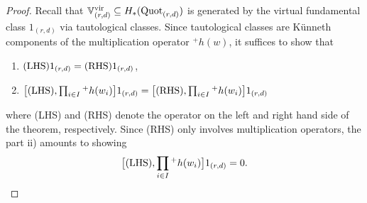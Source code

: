 \documentclass[10pt]{amsart}
\newcommand{\BV}{\mathbb{V}}
\newcommand{\Quot}{\textnormal{Quot}}
\newcommand{\+}{{}^+}
\newcommand{\vir}{\textnormal{vir}}
\theoremstyle{definition}
\theoremstyle {definition}
\theoremstyle {definition}
\begin{document}
\begin{proof}
Recall that $\BV^\vir_{(r,d)}\subseteq H_*(\Quot_{(r,d)})$ is generated by the virtual fundamental class $1_{(r,d)}$ via tautological classes. Since tautological classes are K\"unneth components of the multiplication operator ${}^{+}h(w)$, it suffices to show that 
\begin{enumerate}
    \item [i)] $\textnormal{(LHS)}1_{(r,d)}=\textnormal{(RHS)}1_{(r,d)}$,
    \item [ii)] $\big[\textnormal{(LHS)}, \prod_{i\in I} {}^{+}h(w_i)\big]1_{(r,d)}=\big[\textnormal{(RHS)}, \prod_{i\in I} {}^{+}h(w_i)\big]1_{(r,d)}$
\end{enumerate}
where (LHS) and (RHS) denote the operator on the left and right hand side of the theorem, respectively. Since (RHS) only involves multiplication operators, the part ii) amounts to showing 
$$\big[\textnormal{(LHS)}, \prod_{i\in I} {}^{+}h(w_i)\big]1_{(r,d)}=0.$$ 


\end{proof}
\end{document}
